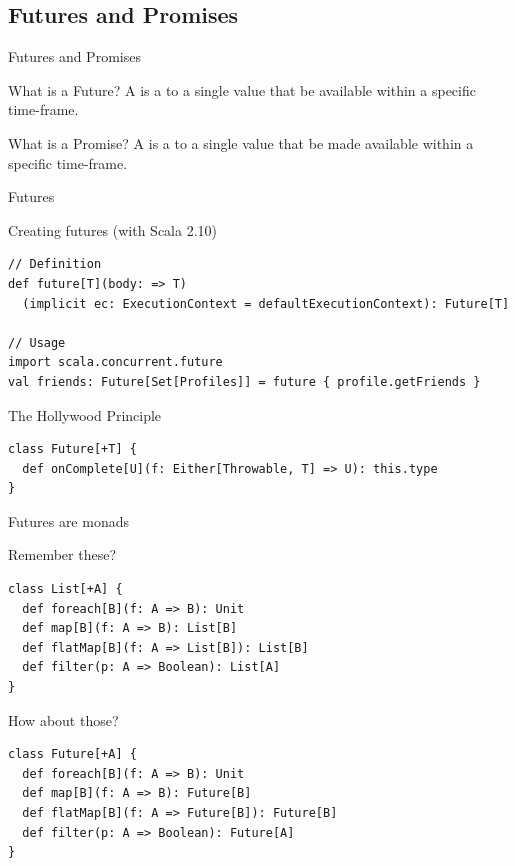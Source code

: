 \subsection{Futures and Promises}
\begin{frame}{Futures and Promises}
\begin{block}{What is a Future?}
A  is a  to a single value
 that  be available within a specific
time-frame.
\end{block}
\pause
\begin{block}{What is a Promise?}
A  is a  to a single value
 that  be made available within a
specific time-frame.
\end{block}
\end{frame}

\begin{frame}[fragile]{Futures}
\begin{block}{Creating futures (with Scala 2.10)}
\begin{lstlisting}
// Definition
def future[T](body: => T)
  (implicit ec: ExecutionContext = defaultExecutionContext): Future[T]
    
// Usage
import scala.concurrent.future
val friends: Future[Set[Profiles]] = future { profile.getFriends }
\end{lstlisting}
\end{block}
\pause
\begin{block}{The Hollywood Principle}
\begin{lstlisting}
class Future[+T] {
  def onComplete[U](f: Either[Throwable, T] => U): this.type
}
\end{lstlisting}
\end{block}
\end{frame}

\begin{frame}[fragile]{Futures are monads}
\begin{exampleblock}{Remember these?}
\begin{lstlisting}
class List[+A] {
  def foreach[B](f: A => B): Unit
  def map[B](f: A => B): List[B]
  def flatMap[B](f: A => List[B]): List[B]
  def filter(p: A => Boolean): List[A]
}
\end{lstlisting}
\end{exampleblock}
\pause
\begin{exampleblock}{How about those?}
\begin{lstlisting}
class Future[+A] {
  def foreach[B](f: A => B): Unit
  def map[B](f: A => B): Future[B]
  def flatMap[B](f: A => Future[B]): Future[B]
  def filter(p: A => Boolean): Future[A]
}
\end{lstlisting}
\end{exampleblock}
\end{frame}

